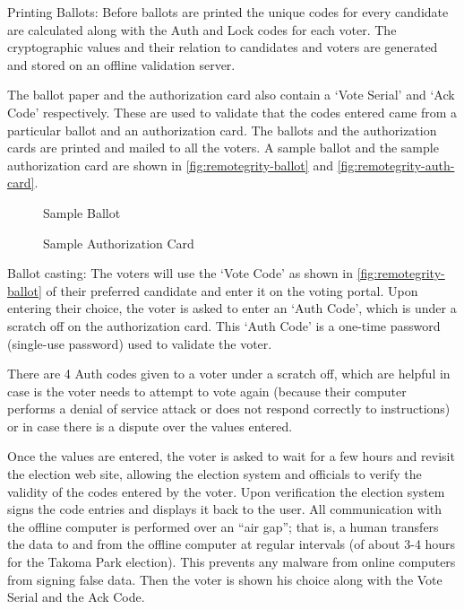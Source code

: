 Printing Ballots: Before ballots are printed the unique codes for every candidate are calculated along with the Auth and Lock codes for each voter. The cryptographic values and their relation to candidates and voters are generated and stored on an offline validation server.

The ballot paper and the authorization card also contain a `Vote Serial' and `Ack Code' respectively. These are used to validate that the codes entered came from a particular ballot and an authorization card. The ballots and the authorization cards are printed and mailed to all the voters. A sample ballot and the sample authorization card are shown in \autoref{fig:remotegrity-ballot} and \autoref{fig:remotegrity-auth-card}.

\begin{figure}
  \centering
  \caption{Sample Ballot}
  \label{fig:remotegrity-ballot}
\end{figure}

\begin{figure}
  \centering
  \caption{Sample Authorization Card}
  \label{fig:remotegrity-auth-card}
\end{figure}

Ballot casting: The voters will use the `Vote Code' as shown in \autoref{fig:remotegrity-ballot} of their preferred candidate and enter it on the voting portal. Upon entering their choice, the voter is asked to enter an `Auth Code', which is under a scratch off on the authorization card. This `Auth Code' is a one-time password (single-use password) used to validate the voter.

There are 4 Auth codes given to a voter under a scratch off, which are helpful in case is the voter needs to attempt to vote again (because their computer performs a denial of service attack or does not respond correctly to instructions) or in case there is a dispute over the values entered.

Once the values are entered, the voter is asked to wait for a few hours and revisit the election web site, allowing the election system and officials to verify the validity of the codes entered by the voter. Upon verification the election system signs the code entries and displays it back to the user. All communication with the offline computer is performed over an ``air gap''; that is, a human transfers the data to and from the offline computer at regular intervals (of about 3-4 hours for the Takoma Park election). This prevents any malware from online computers from signing false data. Then the voter is shown his choice along with the Vote Serial and the Ack Code.

